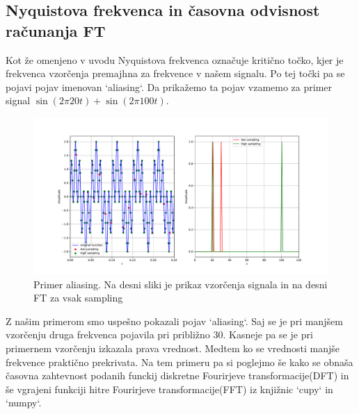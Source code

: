 \documentclass{article}
\begin{document}
\subsection{Nyquistova frekvenca in časovna odvisnost računanja FT}
Kot že omenjeno v uvodu Nyquistova frekvenca označuje kritično točko, kjer je frekvenca vzorčenja premajhna za frekvence v našem signalu. Po tej točki pa se pojavi pojav imenovan `aliasing`. Da prikažemo ta pojav vzamemo za primer signal $\sin(2 \pi 20t) + \sin(2\pi 100 t)$.
\begin{figure}[H]
    \centering
	\includegraphics[width=1\textwidth]{nyquist.pdf}
    \caption{Primer aliasing. Na desni sliki je prikaz vzorčenja signala in na desni FT za vsak sampling}
\end{figure}
Z našim primerom smo uspešno pokazali pojav `aliasing`. Saj se je pri manjšem vzorčenju druga frekvenca pojavila pri približno 30. Kasneje pa se je pri primernem vzorčenju izkazala prava vrednost. Medtem ko se vrednosti manjše frekvence praktično prekrivata. Na tem primeru pa si poglejmo še kako se obnaša časovna zahtevnost podanih funckij diskretne Fourirjeve transformacije(DFT) in še vgrajeni funkciji hitre Fourirjeve transformacije(FFT) iz knjižnic `cupy` in `numpy`.
\end{document}
